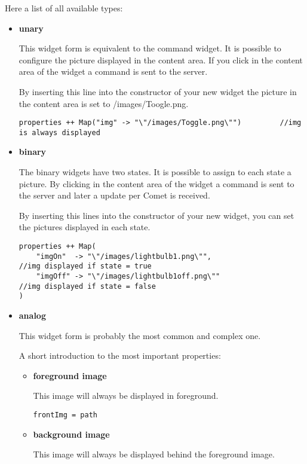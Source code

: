     Here a list of all available types:
\begin{itemize}
    \item \textbf{unary}
    
        This widget form is equivalent to the command widget. It is possible to configure the picture displayed in the content area. If you click in the content area of the widget a command is sent to the server.

        By inserting this line into the constructor of your new widget the picture in the content area is set to /images/Toogle.png.
\begin{lstlisting}[caption=widget configuration unary: Switch.scala,label=lst:h2h:unaryconfig]
properties ++ Map("img" -> "\"/images/Toggle.png\"")         //img is always displayed
\end{lstlisting}
    \item \textbf{binary}
    
        The binary widgets have two states. It is possible to assign to each state a picture. By clicking in the content area of the widget a command is sent to the server and later a update per Comet is received.

        By inserting this lines into the constructor of your new widget, you can set the pictures displayed in each state.
\begin{lstlisting}[caption=widget configuration binary,label=lst:h2h:binaryconfig]
properties ++ Map(
    "imgOn"  -> "\"/images/lightbulb1.png\"",		             //img displayed if state = true
    "imgOff" -> "\"/images/lightbulb1off.png\""                //img displayed if state = false
)
\end{lstlisting}
    \item \textbf{analog}
    
        This widget form is probably the most common and complex one.
        
        A short introduction to the most important properties:
        \begin{itemize}
            \item \textbf{foreground image}


                This image will always be displayed in foreground.

                \lstinline!frontImg = path!
            \item \textbf{background image}


                This image will always be displayed behind the foreground image.


\end{itemize}
\end{itemize}
